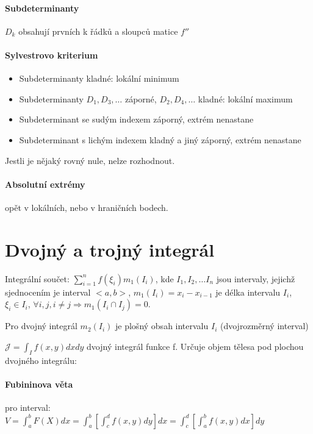 \documentclass[a4paper, 11pt]{report}
\begin{document}
\paragraph{Subdeterminanty} $D_k$ obsahují prvních k řádků a sloupců matice $f''$

\paragraph{Sylvestrovo kriterium}
\begin{itemize}
	\item Subdeterminanty kladné: lokální minimum
	\item Subdeterminanty $D_1, D_3, \dots $ záporné, $D_2, D_4, \dots $ kladné: lokální maximum
	\item Subdeterminant se sudým indexem záporný, extrém nenastane
	\item Subdeterminant s lichým indexem kladný a jiný záporný, extrém nenastane
\end{itemize}

Jestli je nějaký rovný nule, nelze rozhodnout.

\paragraph{Absolutní extrémy} opět v lokálních, nebo v hraničních bodech.

\section{Dvojný a trojný integrál}

Integrální součet: $\sum\limits_{i = 1}^n f(\xi_i) m_1(I_i)$, kde $I_1, I_2, \dots I_n$ jsou intervaly, jejichž sjednocením je interval $<a,b>$, $m_1(I_i) = x_i - x_{i-1}$ je délka intervalu $I_i$, $\xi_i \in I_i$, $\forall i,j, i \neq j \Rightarrow m_1(I_i \cap I_j) = 0$.

Pro dvojný integrál $m_2(I_i)$ je plošný obsah intervalu $I_i$ (dvojrozměrný interval)

$\mathcal{J} = \int_I f(x,y) dx dy$ dvojný integrál funkce f. Určuje objem tělesa pod plochou dvojného integrálu:

\paragraph{Fubininova věta} pro interval: $V = \int_a^b F(X) dx = \int_a^b \left[ \int_c^d f(x,y) dy \right] dx = \int_c^d \left[ \int_a^b f(x,y) dx \right] dy$
\end{document}
